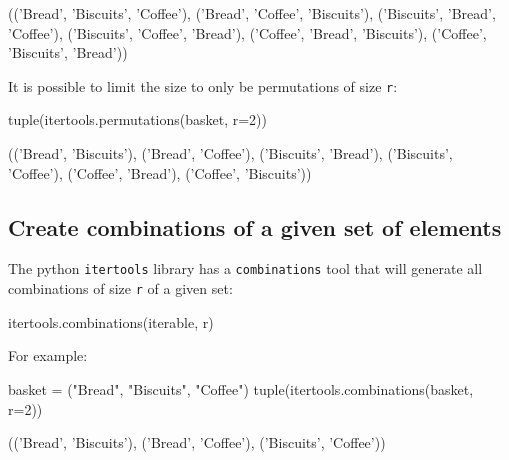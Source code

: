 \begin{raw}
(('Bread', 'Biscuits', 'Coffee'),
 ('Bread', 'Coffee', 'Biscuits'),
 ('Biscuits', 'Bread', 'Coffee'),
 ('Biscuits', 'Coffee', 'Bread'),
 ('Coffee', 'Bread', 'Biscuits'),
 ('Coffee', 'Biscuits', 'Bread'))
\end{raw}





It is possible to limit the size to only be permutations of size \texttt{r}:




\begin{pyin}
tuple(itertools.permutations(basket, r=2))
\end{pyin}





\begin{raw}
(('Bread', 'Biscuits'),
 ('Bread', 'Coffee'),
 ('Biscuits', 'Bread'),
 ('Biscuits', 'Coffee'),
 ('Coffee', 'Bread'),
 ('Coffee', 'Biscuits'))
\end{raw}





\subsection{Create combinations of a given set of elements}
\label{\detokenize{tools-for-mathematics/05-combinations-permutations/how/main:creating-combinations-of-a-given-set-of-elements}}

The python \texttt{itertools} library has a \texttt{combinations} tool that
will generate all combinations of size \texttt{r} of a given set:


\begin{pyin}
itertools.combinations(iterable, r)
\end{pyin}



For example:




\begin{pyin}
basket = ("Bread", "Biscuits", "Coffee")
tuple(itertools.combinations(basket, r=2))
\end{pyin}





\begin{raw}
(('Bread', 'Biscuits'), ('Bread', 'Coffee'), ('Biscuits', 'Coffee'))
\end{raw}





